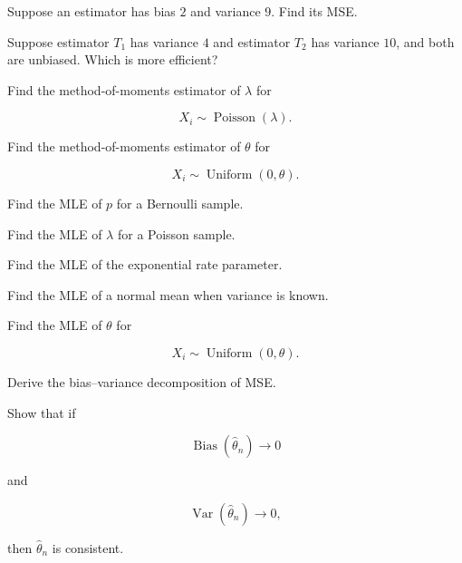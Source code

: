 \begin{exercise}[2]
Suppose an estimator has bias \(2\) and variance \(9\). Find its MSE.
\end{exercise}

\begin{exercise}[2]
Suppose estimator \(T_1\) has variance \(4\) and estimator \(T_2\) has
variance \(10\), and both are unbiased. Which is more efficient?
\end{exercise}

\begin{exercise}[2]
Find the method-of-moments estimator of \(\lambda\) for

\[
X_i\sim\operatorname{Poisson}(\lambda).
\]
\end{exercise}

\begin{exercise}[2]
Find the method-of-moments estimator of \(\theta\) for

\[
X_i\sim\operatorname{Uniform}(0,\theta).
\]
\end{exercise}

\begin{exercise}[2]
Find the MLE of \(p\) for a Bernoulli sample.
\end{exercise}

\begin{exercise}[2]
Find the MLE of \(\lambda\) for a Poisson sample.
\end{exercise}

\begin{exercise}[2]
Find the MLE of the exponential rate parameter.
\end{exercise}

\begin{exercise}[2]
Find the MLE of a normal mean when variance is known.
\end{exercise}

\begin{exercise}[2]
Find the MLE of \(\theta\) for

\[
X_i\sim\operatorname{Uniform}(0,\theta).
\]
\end{exercise}

\begin{exercise}[3]
Derive the bias--variance decomposition of MSE.
\end{exercise}

\begin{exercise}[3]
Show that if

\[
\operatorname{Bias}(\widehat{\theta}_n)\to0
\]

and

\[
\operatorname{Var}(\widehat{\theta}_n)\to0,
\]

then \(\widehat{\theta}_n\) is consistent.
\end{exercise}

